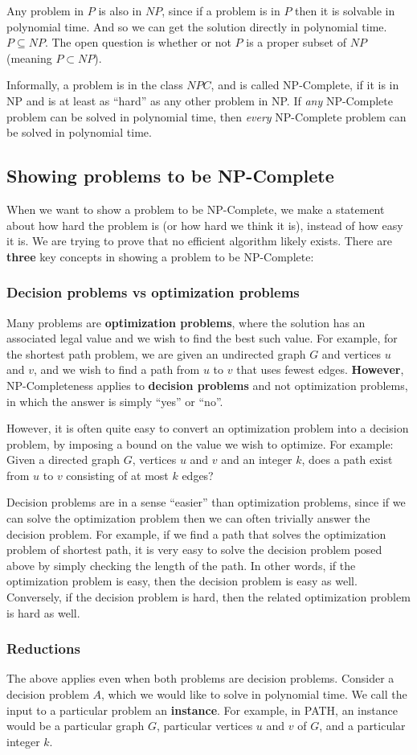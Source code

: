 Any problem in $P$ is also in $NP$, since if a problem is in $P$ then it is solvable in polynomial time. And so
we can get the solution directly in polynomial time. $P \subseteq NP$. The open question is whether or not $P$ is
a proper subset of $NP$ (meaning $P \subset NP$).

Informally, a problem is in the class $NPC$, and is called NP-Complete, if it is in NP and is at least as ``hard''
as any other problem in NP. If \textit{any} NP-Complete problem can be solved in polynomial time, then \textit{every}
NP-Complete problem can be solved in polynomial time.

\subsection{Showing problems to be NP-Complete}
When we want to show a problem to be NP-Complete, we make a statement about how hard the problem is (or how hard we
think it is), instead of how easy it is. We are trying to prove that no efficient algorithm likely exists. There are
\textbf{three} key concepts in showing a problem to be NP-Complete:
%
\subsubsection{Decision problems vs optimization problems}
Many problems are \textbf{optimization problems}, where the solution has an
associated legal value and we wish to find the best such value. For example,
for the shortest path problem, we are given an undirected graph $G$ and
vertices $u$ and $v$, and we wish to find a path from $u$ to $v$ that uses
fewest edges. \textbf{However}, NP-Completeness applies to \textbf{decision problems}
and not optimization problems, in which the answer is simply ``yes'' or ``no''.

However, it is often quite easy to convert an optimization problem into a decision problem, by
imposing a bound on the value we wish to optimize. For example: Given a directed graph $G$, vertices
$u$ and $v$ and an integer $k$, does a path exist from $u$ to $v$ consisting of at most $k$ edges?

Decision problems are in a sense ``easier'' than optimization problems, since if we can solve the optimization
problem then we can often trivially answer the decision problem. For example, if we find a path that solves the
optimization problem of shortest path, it is very easy to solve the decision problem posed above by simply checking
the length of the path. In other words, if the optimization problem is easy, then the decision problem is easy as well.
Conversely, if the decision problem is hard, then the related optimization problem is hard as well.

\subsubsection{Reductions}
The above applies even when both problems are decision problems. Consider a decision problem $A$, which we would like
to solve in polynomial time. We call the input to a particular problem an \textbf{instance}. For example, in PATH,
an instance would be a particular graph $G$, particular vertices $u$ and $v$ of $G$, and a particular integer $k$.